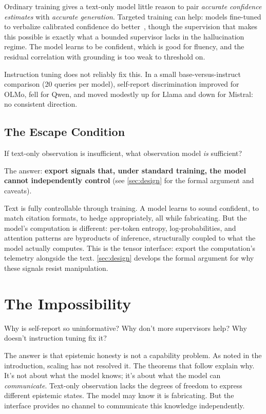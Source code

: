 \documentclass[11pt]{article}
\begin{document}
Ordinary training gives a text-only model little reason to pair \emph{accurate confidence estimates} with \emph{accurate generation}. Targeted training can help: models fine-tuned to verbalize calibrated confidence do better~\citep{lin2022teaching}, though the supervision that makes this possible is exactly what a bounded supervisor lacks in the hallucination regime. The model learns to be confident, which is good for fluency, and the residual correlation with grounding is too weak to threshold on.

Instruction tuning does not reliably fix this. In a small base-versus-instruct comparison (20 queries per model), self-report discrimination improved for OLMo, fell for Qwen, and moved modestly up for Llama and down for Mistral: no consistent direction.

\subsection{The Escape Condition}

If text-only observation is insufficient, what observation model \emph{is} sufficient?

The answer: \textbf{export signals that, under standard training, the model cannot independently control} (see \autoref{sec:design} for the formal argument and caveats).

Text is fully controllable through training. A model learns to sound confident, to match citation formats, to hedge appropriately, all while fabricating. But the model's computation is different: per-token entropy, log-probabilities, and attention patterns are byproducts of inference, structurally coupled to what the model actually computes. This is the tensor interface: export the computation's telemetry alongside the text. \autoref{sec:design} develops the formal argument for why these signals resist manipulation.

\section{The Impossibility}\label{sec:formal}

Why is self-report so uninformative? Why don't more supervisors help? Why doesn't instruction tuning fix it?

The answer is that epistemic honesty is not a capability problem. As noted in the introduction, scaling has not resolved it. The theorems that follow explain why. It's not about what the model knows; it's about what the model can \emph{communicate}. Text-only observation lacks the degrees of freedom to express different epistemic states. The model may know it is fabricating. But the interface provides no channel to communicate this knowledge independently.
\end{document}
